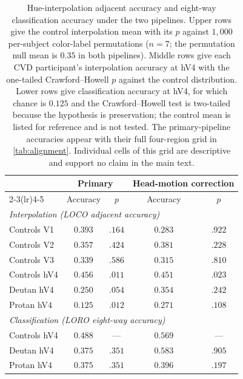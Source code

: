 \begin{table}[h]
\centering
\caption{Hue-interpolation adjacent accuracy and eight-way classification accuracy under the two pipelines. Upper rows give the control interpolation mean with its $p$ against $1{,}000$ per-subject color-label permutations ($n = 7$; the permutation null mean is $0.35$ in both pipelines). Middle rows give each CVD participant's interpolation accuracy at hV4 with the one-tailed Crawford--Howell $p$ against the control distribution. Lower rows give classification accuracy at hV4, for which chance is $0.125$ and the Crawford--Howell test is two-tailed because the hypothesis is preservation; the control mean is listed for reference and is not tested. The primary-pipeline accuracies appear with their full four-region grid in \cref{tab:alignment}. Individual cells of this grid are descriptive and support no claim in the main text.}
\label{tab:interp_arms}
\begin{tabular}{lcccc}
\toprule
 & \multicolumn{2}{c}{Primary} & \multicolumn{2}{c}{Head-motion correction} \\
\cmidrule(lr){2-3}\cmidrule(lr){4-5}
 & Accuracy & $p$ & Accuracy & $p$ \\
\midrule
\multicolumn{5}{l}{\emph{Interpolation (LOCO adjacent accuracy)}} \\
Controls V1  & $0.393$ & $.164$ & $0.283$ & $.922$ \\
Controls V2  & $0.357$ & $.424$ & $0.381$ & $.228$ \\
Controls V3  & $0.339$ & $.586$ & $0.315$ & $.810$ \\
Controls hV4 & $0.456$ & $.011$ & $0.451$ & $.023$ \\
Deutan hV4 & $0.250$ & $.054$ & $0.354$ & $.242$ \\
Protan hV4 & $0.125$ & $.012$ & $0.271$ & $.108$ \\
\midrule
\multicolumn{5}{l}{\emph{Classification (LORO eight-way accuracy)}} \\
Controls hV4 & $0.488$ & --- & $0.569$ & --- \\
Deutan hV4 & $0.375$ & $.351$ & $0.583$ & $.905$ \\
Protan hV4 & $0.375$ & $.351$ & $0.396$ & $.197$ \\
\bottomrule
\end{tabular}
\end{table}


